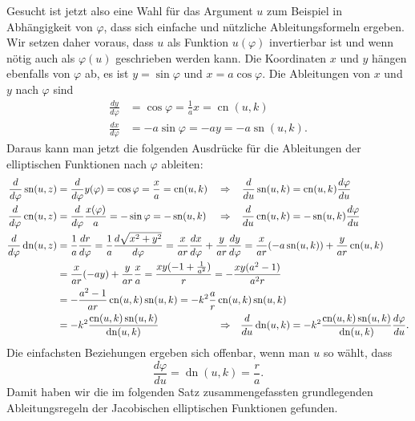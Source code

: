 Gesucht ist jetzt also eine Wahl für das Argument $u$ zum Beispiel in
Abhängigkeit von $\varphi$, dass sich einfache und nützliche
Ableitungsformeln ergeben.
Wir setzen daher voraus, dass $u$ als Funktion $u(\varphi)$ invertierbar
ist und wenn nötig auch als $\varphi(u)$ geschrieben werden kann.
Die Koordinaten $x$ und $y$ hängen ebenfalls von $\varphi$ ab, es ist
$y=\sin\varphi$ und $x=a\cos\varphi$.
Die Ableitungen von $x$ und $y$ nach $\varphi$ sind
\begin{align*}
\frac{dy}{d\varphi}
&=
\cos\varphi
=
\frac{1}{a} x
=
\operatorname{cn}(u,k)
\\
\frac{dx}{d\varphi}
&=
-a\sin\varphi
=
-a y
=
-a\operatorname{sn}(u,k).
\end{align*}
Daraus kann man jetzt die folgenden Ausdrücke für die Ableitungen der
elliptischen Funktionen nach $\varphi$ ableiten:
\begin{align*}
\frac{d}{d\varphi} \operatorname{sn}(u,z)
&=
\frac{d}{d\varphi} y(\varphi)
=
\cos\varphi
=
\frac{x}{a}
=
\operatorname{cn}(u,k)
&&\Rightarrow&
\frac{d}{du}
\operatorname{sn}(u,k)
&=
\operatorname{cn}(u,k) \frac{d\varphi}{du}
\\
\frac{d}{d\varphi} \operatorname{cn}(u,z)
&=
\frac{d}{d\varphi} \frac{x(\varphi)}{a}
=
-\sin\varphi
=
-\operatorname{sn}(u,k)
&&\Rightarrow&
\frac{d}{du}\operatorname{cn}(u,k)
&=
-\operatorname{sn}(u,k) \frac{d\varphi}{du}
\\
\frac{d}{d\varphi} \operatorname{dn}(u,z)
&=
\frac{1}{a}\frac{dr}{d\varphi}
=
\frac{1}{a}\frac{d\sqrt{x^2+y^2}}{d\varphi}
\rlap{$\displaystyle\mathstrut
=
\frac{x}{ar} \frac{dx}{d\varphi}
+
\frac{y}{ar} \frac{dy}{d\varphi}
=
\frac{x}{ar} (-a\operatorname{sn}(u,k))
+
\frac{y}{ar} \operatorname{cn}(u,k)
$}
\\
&
\rlap{$\displaystyle\mathstrut
=
\frac{x}{ar}(-ay)
+
\frac{y}{ar} \frac{x}{a}
=
\frac{xy(-1+\frac{1}{a^2})}{r} 
=
-\frac{xy(a^2-1)}{a^2r} 
$}
\\
&=
-\frac{a^2-1}{ar}
\operatorname{cn}(u,k) \operatorname{sn}(u,k)
\rlap{$\displaystyle\mathstrut
=
-k^2
\frac{a}{r}
\operatorname{cn}(u,k) \operatorname{sn}(u,k)
$}
\\
&=
-k^2\frac{\operatorname{cn}(u,k)\operatorname{sn}(u,k)}{\operatorname{dn}(u,k)}
&&\Rightarrow&
\frac{d}{du} \operatorname{dn}(u,k)
&=
-k^2\frac{\operatorname{cn}(u,k)
\operatorname{sn}(u,k)}{\operatorname{dn}(u,k)}
\frac{d\varphi}{du}.
\end{align*}
Die einfachsten Beziehungen ergeben sich offenbar, wenn man $u$ so
wählt, dass
\[
\frac{d\varphi}{du}
=
\operatorname{dn}(u,k)
=
\frac{r}{a}.
\]
Damit haben wir die im folgenden Satz zusammengefassten
grundlegenden Ableitungsregeln der Jacobischen elliptischen Funktionen
gefunden.

